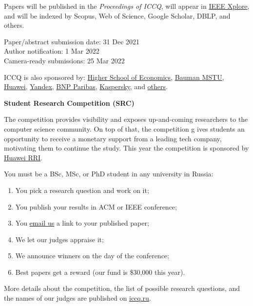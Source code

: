 \documentclass{../cfp}
\begin{document}
Papers will be published in the \textit{Proceedings of ICCQ},
will appear in \href{https://ieeexplore.ieee.org/Xplore/home.jsp}{IEEE Xplore\textsuperscript{\textregistered}},
and will be indexed by Scopus, Web of Science, Google Scholar, DBLP, and others.

\begin{adjustwidth}{1.5in}{0pt}
\vspace{6pt}
Paper/abstract submission date: 31 Dec 2021 \\
Author notification: 1 Mar 2022 \\
Camera-ready submissions: 25 Mar 2022

\vspace{6pt}
ICCQ is also sponsored by:
\href{https://www.hse.ru/en/}{Higher School of Economics},
\href{https://bmstu.ru/en/}{Bauman MSTU},
\href{https://www.huawei.com/}{Huawei},
\href{https://yandex.com/company/}{Yandex},
\href{https://www.linkedin.com/company/btechrussia}{BNP Paribas},
\href{https://www.kaspersky.com/}{Kaspersky},
and \href{https://www.iccq.ru/2022.html#partners}{others}.
\end{adjustwidth}

\newpage

{\color{xred}\bfseries{\Large Student Research Competition (SRC)}}

The competition provides visibility and exposes up-and-coming
researchers to the computer science community. On top of that, the competition g
ives students an opportunity to receive a monetary support from a leading tech
company, motivating them to continue the study.
This year the competition is sponsored by \href{https://career.huawei.ru/rri/}{Huawei RRI}.

You must be a BSc, MSc, or PhD student in any university in Russia:

\begin{enumerate}
\item You pick a research question and work on it;
\item You publish your results in ACM or IEEE conference;
\item You \href{mailto:src@iccq.ru}{email us} a link to your published paper;
\item We let our judges appraise it;
\item We announce winners on the day of the conference;
\item Best papers get a reward (our fund is \$30,000 this year).
\end{enumerate}

More details about the competition, the list of possible research questions,
and the names of our judges are published on \href{https://www.iccq.ru}{iccq.ru}.

\end{document}
